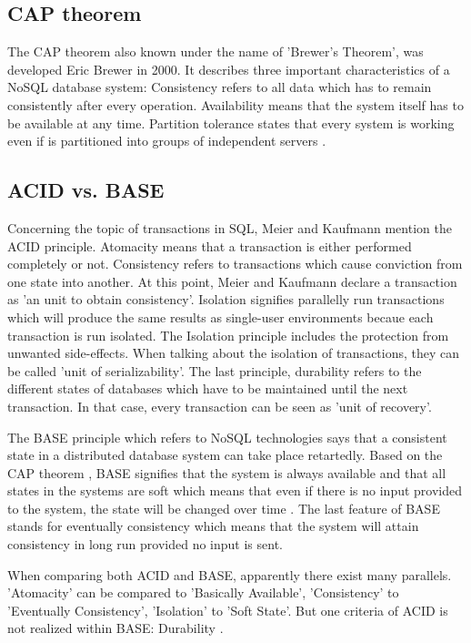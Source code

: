 \subsection{CAP theorem} \label{CAP}

The \ac{CAP} theorem \cite[p.15 ff.]{mongodb_edward} also known under the name of  'Brewer's Theorem', was developed Eric Brewer in 2000. It describes three important characteristics of a NoSQL database system: Consistency refers to all data which has to remain consistently after every operation. Availability means that the system itself has to be available at any time. Partition tolerance states that every system is working even if is partitioned into groups of independent servers \cite[p.15 ff.]{mongodb_edward}.

\subsection{ACID vs. BASE}

Concerning the topic of transactions in SQL, Meier and Kaufmann \cite[p.136 ff.]{nosql_meier} mention the \ac{ACID} principle. Atomacity means that a transaction is either performed completely or not. Consistency refers to transactions which cause conviction from one state into another. At this point, Meier and Kaufmann declare a transaction as 'an unit to obtain consistency'. Isolation signifies parallelly run transactions which will produce the same results as single-user environments becaue each transaction is run isolated. The Isolation principle includes the protection from unwanted side-effects. When talking about the isolation of transactions, they can be called 'unit of serializability'. The last principle, durability refers to the different states of databases which have to be maintained until the next transaction. In that case, every transaction can be seen as 'unit of recovery'.

The \ac{BASE} principle which refers to NoSQL technologies says that a consistent state in a distributed database system can take place retartedly. Based on the CAP theorem \pageref{CAP}, BASE signifies that the system is always available and that all states in the systems are soft which means that even if there is no input provided to the system, the state will be changed over time \cite[p.15 ff.]{mongodb_edward}. The last feature of BASE stands for eventually consistency which means that the system will attain consistency in long run provided no input is sent.

When comparing both ACID and BASE, apparently there exist many parallels. 'Atomacity' can be compared to 'Basically Available', 'Consistency' to 'Eventually Consistency', 'Isolation' to 'Soft State'. But one criteria of ACID is not realized within BASE: Durability \cite[p.1 ff.]{mongodb_edward}.

